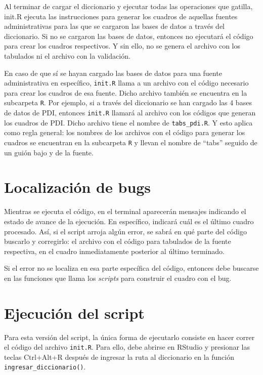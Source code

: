 \documentclass[
  spanish,
]{book}
\begin{document}
Al terminar de cargar el diccionario y ejecutar todas las operaciones que gatilla, init.R ejecuta las instrucciones para generar los cuadros de aquellas fuentes administrativas para las que se cargaron las bases de datos a través del diccionario. Si no se cargaron las bases de datos, entonces no ejecutará el código para crear los cuadros respectivos. Y sin ello, no se genera el archivo con los tabulados ni el archivo con la validación.

En caso de que sí se hayan cargado las bases de datos para una fuente administrativa en específico, \texttt{init.R} llama a un archivo con el código necesario para crear los cuadros de esa fuente. Dicho archivo también se encuentra en la subcarpeta \texttt{R}. Por ejemplo, si a través del diccionario se han cargado las 4 bases de datos de PDI, entonces \texttt{init.R} llamará al archivo con los códigos que generan los cuadros de PDI. Dicho archivo tiene el nombre de \texttt{tabs\_pdi.R}. Y esto aplica como regla general: los nombres de los archivos con el código para generar los cuadros se encuentran en la subcarpeta \texttt{R} y llevan el nombre de ``tabs'' seguido de un guión bajo y de la fuente.

\hypertarget{localizaciuxf3n-de-bugs}{%
\section{Localización de bugs}\label{localizaciuxf3n-de-bugs}}

Mientras se ejecuta el código, en el terminal aparecerán mensajes indicando el estado de avance de la ejecución. En específico, indicará cuál es el último cuadro procesado. Así, si el script arroja algún error, se sabrá en qué parte del código buscarlo y corregirlo: el archivo con el código para tabulados de la fuente respectiva, en el cuadro inmediatamente posterior al último terminado.

Si el error no se localiza en esa parte específica del código, entonces debe buscarse en las funciones que llama los \emph{scripts} para construir el cuadro con el bug.

\hypertarget{ejecuciuxf3n-del-script}{%
\section{Ejecución del script}\label{ejecuciuxf3n-del-script}}

Para esta versión del script, la única forma de ejecutarlo consiste en hacer correr el código del archivo \texttt{init.R}. Para ello, debe abrirse en RStudio y presionar las teclas Ctrl+Alt+R después de ingresar la ruta al diccionario en la función \texttt{ingresar\_diccionario()}.
\end{document}
